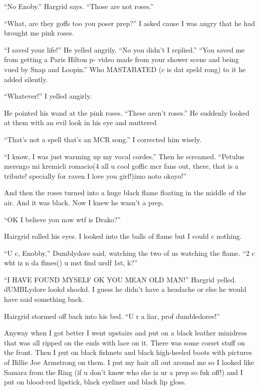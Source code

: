 \enquote{No Enoby.} Hargrid says. \enquote{Those are not roses.}

\enquote{What, are they goffs too you poser prep?} I asked cause I was angry that he had brought me pink roses.

\enquote{I saved your life!} He yelled angrily. \enquote{No you didn't I replied.} \enquote{You saved me from getting a Paris Hilton p- video made from your shower scene and being vued by Snap and Loopin.} Who MASTABATED (c is dat speld rong) to it he added silently.

\enquote{Whatever!} I yelled angirly.

He pointed his wand at the pink roses. \enquote{These aren't roses.} He suddenly looked at them with an evil look in his eye and muttered 

\enquote{That's not a spell that's an MCR song.} I corrected him wisely.

\enquote{I know, I was just warming up my vocal cordes.} Then he screamed. \enquote{Petulus merengo mi kremicli romacio(4 all u cool gof\-fic mcr fans out, there, that is a tribute! specially for raven I love you girl!)imo noto okayo!}

And then the roses turned into a huge black flame floating in the middle of the air. And it was black. Now I knew he wasn't a prep.

\enquote{OK I believe you now wtf is Drako?}

Hairgrid rolled his eyes. I looked into the balls of flame but I could c nothing.

\enquote{U c, Enobby,} Dumblydore said, watching the two of us watching the flame. \enquote{2 c wht iz n da flmes() u mst find urslf 1st, k?}

\enquote{I HAVE FOUND MYSELF OK YOU MEAN OLD MAN\@!} Hargrid yelled. dUMBLydore lookd shockd. I guess he didn't have a headache or else he would have said something back.

Hairgrid stormed off back into his bed. \enquote{U r a liar, prof dumbledoree!}

Anyway when I got better I went upstairs and put on a black leather minidress that was all ripped on the ends with lace on it. There was some corset stuff on the front. Then I put on black fishnets and black high-heeled boots with pictures of Billie Joe Armstrong on them. I put my hair all out around me so I looked like Samara from the Ring (if u don't know who she iz ur a prep so fuk off!) and I put on blood-red lipstick, black eyeliner and black lip gloss.

